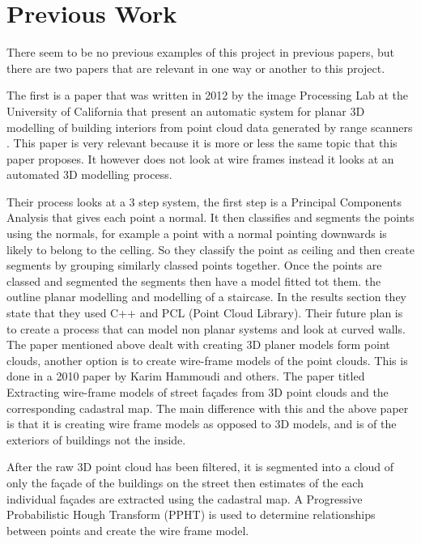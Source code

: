 

\section{Previous Work}


There seem to be no previous examples of this project in previous papers, but there are two papers that are relevant in one way or another to this project.

The first is a paper that was written in 2012 by the image Processing Lab at the University of California that present an automatic system for planar 3D modelling of building interiors from point cloud data generated by range scanners \cite{VS12}. This paper is very relevant because it is more or less the same topic that this paper proposes. It however does not look at wire frames instead it looks at an automated 3D modelling process.

Their process looks at a 3 step system, the first step is a Principal Components Analysis that gives each point a normal.
It then classifies and segments the points using the normals, for example a point with a normal pointing downwards is likely to belong to the celling. So they classify the point as ceiling and then create segments by grouping similarly classed points together.
Once the points are classed and segmented the segments then have a model fitted tot them. the outline planar modelling and modelling of a staircase. In the results section they state that they used C++ and PCL (Point Cloud Library). Their future plan is to create a process that can model non planar systems and look at curved walls.\\


The paper mentioned above dealt with creating 3D planer models form point clouds, another option is to create wire-frame models of the point clouds. This is done in a 2010 paper by Karim Hammoudi and others\cite{Ham12}. The paper titled Extracting wire-frame models of street fa\c{c}ades from 3D point clouds and the corresponding cadastral map. The main difference with this and the above paper is that it is creating wire frame models as opposed to 3D models, and is of the exteriors of buildings not the inside.

After the raw 3D point cloud has been filtered, it is segmented into a cloud of only the fa\c{c}ade of the buildings on the street then estimates of the each individual fa\c{c}ades are extracted using the cadastral map. A Progressive Probabilistic Hough Transform (PPHT) is used to determine relationships between points and create the wire frame model.



